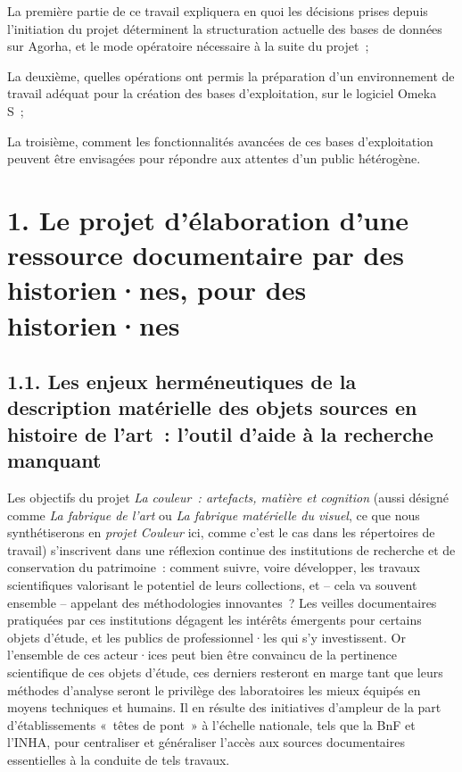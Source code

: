 \documentclass[a4paper,12pt, twoside]{book}
\begin{document}
\bigskip

La première partie de ce travail expliquera en quoi les décisions prises depuis l’initiation du projet déterminent la structuration actuelle des bases de données sur Agorha, et le mode opératoire nécessaire à la suite du projet~;

La deuxième, quelles opérations ont permis la préparation d’un environnement de travail adéquat pour la création des bases d’exploitation, sur le logiciel Omeka S~;

La troisième, comment les fonctionnalités avancées de ces bases d’exploitation peuvent être envisagées pour répondre aux attentes d’un public hétérogène.

\mainmatter

\clearemptydoublepage
\chapter*{1. Le projet d’élaboration d’une ressource documentaire par des historien·nes, pour des historien·nes}

\section*{1.1. Les enjeux herméneutiques de la description matérielle des objets sources en histoire de l'art~: l’outil d’aide à la recherche manquant}

Les objectifs du projet \textit{La couleur~: artefacts, matière et cognition} (aussi désigné comme \textit{La fabrique de l’art} ou \textit{La fabrique matérielle du visuel}, ce que nous synthétiserons en \textit{projet Couleur} ici, comme c’est le cas dans les répertoires de travail) s’inscrivent dans une réflexion continue des institutions de recherche et de conservation du patrimoine~: comment suivre, voire développer, les travaux scientifiques valorisant le potentiel de leurs collections, et -- cela va souvent ensemble -- appelant des méthodologies innovantes~? Les veilles documentaires pratiquées par ces institutions dégagent les intérêts émergents pour certains objets d’étude, et les publics de professionnel·les qui s’y investissent. Or l’ensemble de ces acteur·ices peut bien être convaincu de la pertinence scientifique de ces objets d’étude, ces derniers resteront en marge tant que leurs méthodes d’analyse seront le privilège des laboratoires les mieux équipés en moyens techniques et humains. Il en résulte des initiatives d’ampleur de la part d’établissements «~têtes de pont~» à l’échelle nationale, tels que la BnF et l’INHA, pour centraliser et généraliser l’accès aux sources documentaires essentielles à la conduite de tels travaux.
\end{document}
